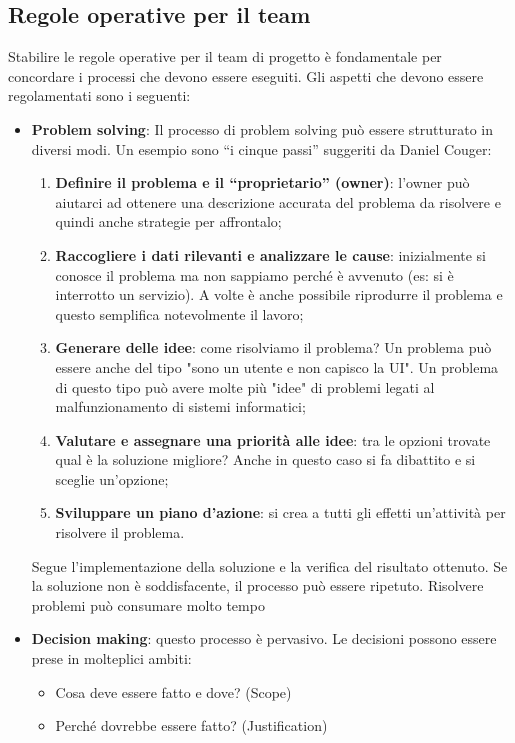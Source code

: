 \subsection{Regole operative per il team}
Stabilire le regole operative per il team di progetto è fondamentale per concordare i processi che devono essere eseguiti.\newline
Gli aspetti che devono essere regolamentati sono i seguenti:
\begin{itemize}
	\item \textbf{Problem solving}: Il processo di problem solving può essere strutturato in diversi modi. Un esempio sono “i cinque passi” suggeriti da Daniel Couger:
	\begin{enumerate}
		\item \textbf{Definire il problema e il “proprietario” (owner)}: l'owner può aiutarci ad ottenere una descrizione accurata del problema da risolvere e quindi anche strategie per affrontalo;
		\item \textbf{Raccogliere i dati rilevanti e analizzare le cause}: inizialmente si conosce il problema ma non sappiamo perché è avvenuto (es: si è interrotto un servizio). A volte è anche possibile riprodurre il problema e questo semplifica notevolmente il lavoro;
		\item \textbf{Generare delle idee}: come risolviamo il problema? Un problema può essere anche del tipo "sono un utente e non capisco la UI". Un problema di questo tipo può avere molte più "idee" di problemi legati al malfunzionamento di sistemi informatici;
		\item \textbf{Valutare e assegnare una priorità alle idee}: tra le opzioni trovate qual è la soluzione migliore? Anche in questo caso si fa dibattito e si sceglie un'opzione;
		\item \textbf{Sviluppare un piano d’azione}: si crea a tutti gli effetti un'attività per risolvere il problema.
	\end{enumerate}
	Segue l’implementazione della soluzione e la verifica del risultato ottenuto.
	Se la soluzione non è soddisfacente, il processo può essere ripetuto. Risolvere problemi può consumare molto tempo
	\item \textbf{Decision making}: questo processo è pervasivo. Le decisioni possono essere prese in molteplici ambiti:
	\begin{itemize}
		\item Cosa deve essere fatto e dove? (Scope)
		\item Perché dovrebbe essere fatto? (Justification)

\end{itemize}
\end{itemize}
